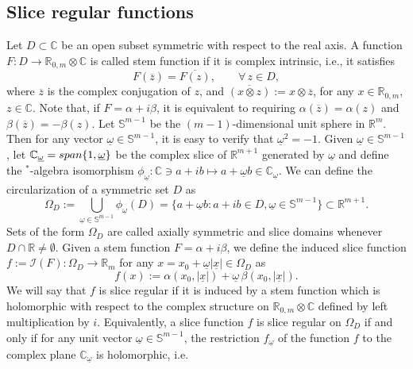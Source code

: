\documentclass{amsart}
\theoremstyle{definition}
\theoremstyle{remark}
\numberwithin{equation}{section}
\begin{document}
\subsection{Slice regular functions}
Let $D\subset\mathbb{C}$ be an open subset symmetric with respect to the real axis. A function $F\colon D\to \mathbb{R}_{0, m}\otimes\mathbb{C}$ is called stem function if it is complex intrinsic, i.e., it satisfies
\begin{equation*}
    F(\overline{z})=\overline{F(z)},\qquad\forall \, z\in D,
\end{equation*}
where $\overline{z}$ is the complex conjugation of $z$, and $\overline{(x\otimes z)}:= x\otimes \overline{z}$, for any $x\in\mathbb{R}_{0, m}$, $z\in\mathbb{C}$. Note that, if $F=\alpha+i\beta$, it is equivalent to requiring $\alpha(\overline{z})=\alpha(z)$ and $\beta(\overline{z})=-\beta(z)$.
Let $\mathbb{S}^{m-1}$ be the $(m-1)$-dimensional unit sphere in $\mathbb{R}^{m}$. Then for any  vector $ \underline{\omega} \in \mathbb{S}^{m-1}$, it is easy to verify that $\underline{\omega}^{2}=-1$. Given $\underline\omega\in\mathbb{S}^{m-1}$, let $\mathbb{C}_{\underline\omega}={\rm span}\{1,\underline\omega\}$ be the complex slice of $\mathbb{R}^{m+1}$ generated by $\underline\omega$ and define the $^\ast$-algebra isomorphism $\phi_{\underline\omega}:\mathbb{C}\ni a+ib\mapsto a+\underline\omega b\in\mathbb{C}_{\underline\omega}$. We can define the circularization of a symmetric set $D$ as
\begin{equation*}
    \Omega_D:=\bigcup_{\underline\omega\in\mathbb{S}^{m-1}}\phi_{\underline\omega}(D)=\{a+\underline\omega b: a+ib\in D, \underline\omega\in\mathbb{S}^{m-1}\}\subset\mathbb{R}^{m+1}.
\end{equation*}
Sets of the form $\Omega_D$ are called axially symmetric and slice domains whenever $D\cap\mathbb{R}\neq\emptyset$.
Given a stem function $F=\alpha+i \beta$, we define the induced slice function $f:=\mathcal{I}(F):\Omega_D\to\mathbb{R}_m$ for any $x=x_0+\underline\omega|\underline x|\in\Omega_D$ as
\begin{equation}\label{sf1}
    f(x):=\alpha(x_0,|\underline x|)+\underline{\omega} \, \beta(x_0,|\underline x|).
\end{equation}
We will say that $f$ is slice regular if it is induced by a stem function which is holomorphic with respect to the complex structure on $\mathbb{R}_{0, m}\otimes\mathbb{C}$ defined by left multiplication by $i$. Equivalently, a slice function $f$ is slice regular on $\Omega_D$ if and only if for  any unit vector $\underline{\omega}\in \mathbb{S}^{m-1}$,  the restriction $f_{\underline{\omega}}$  of the function $f$ to the complex plane $\mathbb{C}_{\underline{\omega}}$ is holomorphic, i.e.
\end{document}
